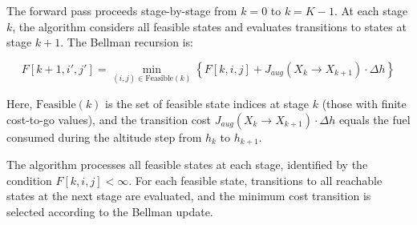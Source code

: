 The forward pass proceeds stage-by-stage from $k = 0$ to $k = K-1$. At each stage $k$, the algorithm considers all feasible states and evaluates transitions to states at stage $k+1$. The Bellman recursion is:

\begin{equation}
F[k+1, i', j'] = \min_{(i,j) \in \text{Feasible}(k)} \left\{ F[k, i, j] + J_{aug}(X_k \to X_{k+1}) \cdot \Delta h \right\}
\end{equation}

Here, $\text{Feasible}(k)$ is the set of feasible state indices at stage $k$ (those with finite cost-to-go values), and the transition cost $J_{aug}(X_k \to X_{k+1}) \cdot \Delta h$ equals the fuel consumed during the altitude step from $h_k$ to $h_{k+1}$.

The algorithm processes all feasible states at each stage, identified by the condition $F[k, i, j] < \infty$. For each feasible state, transitions to all reachable states at the next stage are evaluated, and the minimum cost transition is selected according to the Bellman update.

